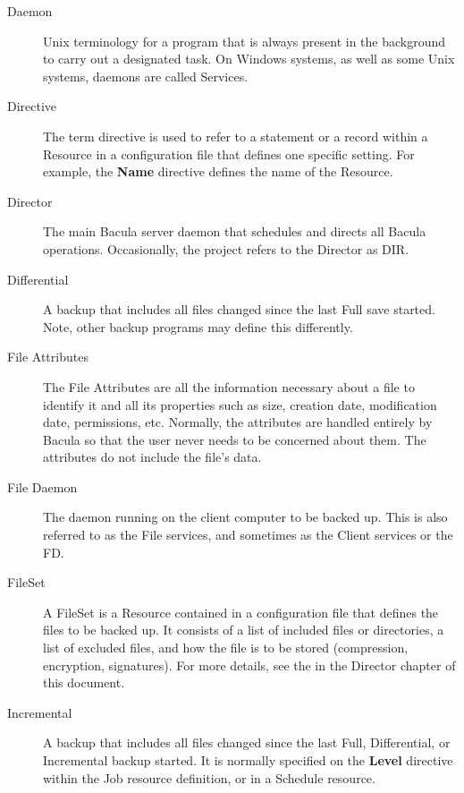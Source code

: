 \begin{description}
\item [Daemon]
   Unix terminology for a program that is always present in  the background to
   carry out a designated task. On Windows systems, as well as some Unix
   systems, daemons are called Services. 

\item [Directive]
   The term directive is used to refer to a statement or a record within a
   Resource in a configuration file that defines one specific setting.  For
   example, the {\bf Name} directive defines the name of the Resource.

\item [Director]
   The main Bacula server daemon that schedules and directs all  Bacula
   operations. Occasionally, the project refers to the Director as DIR. 

\item [Differential]
   A backup that includes all files changed since the last  Full save started.
   Note, other backup programs may define this differently. 

\item [File Attributes]
   The File Attributes are all the information  necessary about a file to
   identify it and all its properties such as  size, creation date, modification
   date, permissions, etc. Normally, the  attributes are handled entirely by
   Bacula so that the user never  needs to be concerned about them. The
   attributes do not include the  file's data. 

\item [File Daemon]
   The daemon running on the client  computer to be backed up. This is also
   referred to as the File  services, and sometimes as the Client services or the
   FD. 

\label{FileSetDef}
\item [FileSet]
   A FileSet is a Resource contained in a configuration file that defines
   the files to be backed up.  It consists of a list of included files or
   directories, a list of excluded files, and how the file is to be stored
   (compression, encryption, signatures).  For more details, see the
    in the Director
   chapter of this document.

\item [Incremental]
   A backup that includes all files changed since the  last Full, Differential,
   or Incremental backup started. It is normally  specified on the {\bf Level}
   directive within the Job resource  definition, or in a Schedule resource. 


\end{description}
